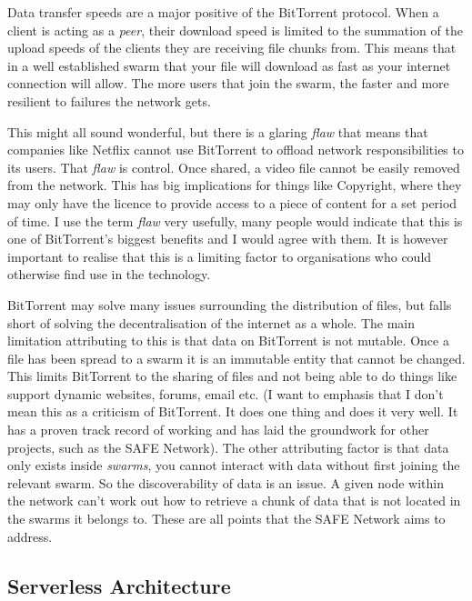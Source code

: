 Data transfer speeds are a major positive of the BitTorrent protocol. When a client is acting as a \textit{peer}, their download speed is limited to the summation of the upload speeds of the clients they are receiving file chunks from. This means that in a well established swarm that your file will download as fast as your internet connection will allow. The more users that join the swarm, the faster and more resilient to failures the network gets.

This might all sound wonderful, but there is a glaring \textit{flaw} that means that companies like Netflix cannot use BitTorrent to offload network responsibilities to its users. That \textit{flaw} is control. Once shared, a video file cannot be easily removed from the network. This has big implications for things like Copyright, where they may only have the licence to provide access to a piece of content for a set period of time. I use the term \textit{flaw} very usefully, many people would indicate that this is one of BitTorrent's biggest benefits and I would agree with them. It is however important to realise that this is a limiting factor to organisations who could otherwise find use in the technology.

BitTorrent may solve many issues surrounding the distribution of files, but falls short of solving the decentralisation of the internet as a whole. The main limitation attributing to this is that data on BitTorrent is not mutable. Once a file has been spread to a swarm it is an immutable entity that cannot be changed. This limits BitTorrent to the sharing of files and not being able to do things like support dynamic websites, forums, email etc. (I want to emphasis that I don't mean this as a criticism of BitTorrent. It does one thing and does it very well. It has a proven track record of working and has laid the groundwork for other projects, such as the SAFE Network). The other attributing factor is that data only exists inside \textit{swarms}, you cannot interact with data without first joining the relevant swarm. So the discoverability of data is an issue. A given node within the network can't work out how to retrieve a chunk of data that is not located in the swarms it belongs to. These are all points that the SAFE Network aims to address.

\subsection{Serverless Architecture}

